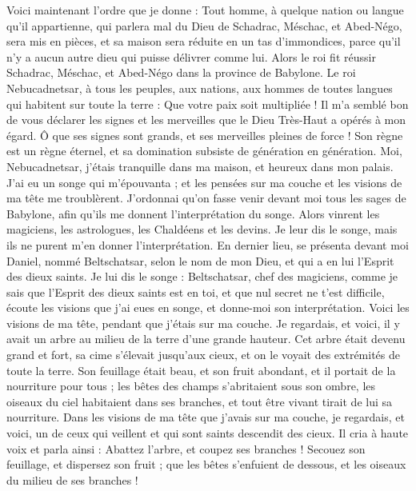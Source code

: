 \begin{multicols}{2}
Voici maintenant l’ordre que je donne : Tout homme, à quelque nation ou langue qu'il appartienne, qui parlera mal du Dieu de Schadrac, Méschac, et Abed-Négo, sera mis en pièces, et sa maison sera réduite en un tas d’immondices, parce qu'il n'y a aucun autre dieu qui puisse délivrer comme lui.
Alors le roi fit réussir Schadrac, Méschac, et Abed-Négo dans la province de Babylone.
\VerseOne{}Le roi Nebucadnetsar, à tous les peuples, aux nations, aux hommes de toutes  langues qui habitent sur toute la terre : Que votre paix soit multipliée !
Il m'a semblé bon de vous déclarer les signes et les merveilles que le Dieu Très-Haut a opérés à mon égard.
Ô que ses signes sont grands, et ses merveilles pleines de force ! Son règne est un règne éternel, et sa domination subsiste de génération en génération.
Moi, Nebucadnetsar, j'étais tranquille dans ma maison, et heureux dans mon palais.
J’ai eu un songe qui m'épouvanta ; et les pensées sur ma couche et les visions de ma tête me troublèrent.
J’ordonnai qu'on fasse venir devant moi tous les sages de Babylone, afin qu'ils me donnent l'interprétation du songe.
Alors vinrent les magiciens, les astrologues, les Chaldéens et les devins. Je leur dis le songe, mais ils ne purent m'en donner l'interprétation.
En dernier lieu, se présenta devant moi Daniel, nommé Beltschatsar, selon le nom de mon Dieu, et qui a en lui l'Esprit des dieux saints. Je lui dis le songe :
Beltschatsar, chef des magiciens, comme je sais que l'Esprit des dieux saints est en toi, et que nul secret ne t'est difficile, écoute les visions que j’ai eues en songe, et donne-moi  son interprétation.
Voici les visions de ma tête, pendant que j’étais sur ma couche. Je regardais, et voici, il y avait  un arbre au milieu de la terre d’une grande hauteur.
Cet arbre était devenu grand et fort, sa cime s’élevait jusqu’aux cieux, et on le voyait des extrémités de toute la terre.
Son feuillage était beau, et son fruit abondant, et il portait de la nourriture pour tous ; les bêtes des champs s’abritaient sous son ombre, les oiseaux du ciel habitaient dans ses branches, et tout être vivant tirait de lui sa nourriture.
Dans les visions de ma tête que j’avais  sur ma couche, je regardais, et voici, un de ceux qui veillent et qui sont saints descendit des cieux.
Il cria à haute voix et parla ainsi : Abattez l'arbre, et coupez ses branches ! Secouez son feuillage, et dispersez son fruit ; que les bêtes s’enfuient de dessous, et les oiseaux du milieu de ses branches !

\end{multicols}
